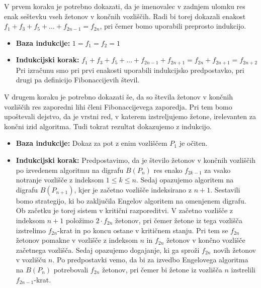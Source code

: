 \documentclass[twoside,11pt]{article}
\begin{document}
\begin{dokaz}
V prvem koraku je potrebno dokazati, da je imenovalec v zadnjem ulomku res enak seštevku vseh žetonov v končnih vozliščih. 
Radi bi torej dokazali enakost $f_1+f_3+f_5+\ldots+f_{2n-1}=f_{2n}$, pri čemer bomo uporabili preprosto indukcijo.
\begin{itemize}
    \item [] \textbf{Baza indukcije:} \quad $1=f_1=f_2=1$
    \item [] \textbf{Indukcijski korak:} \quad $f_1+f_3+f_5+\ldots+f_{2n-1}+f_{2n+1} = f_{2n} + f_{2n+1} = f_{2n+2}$ \\
    Pri izračunu smo pri prvi enakosti uporabili indukcijsko predpostavko, pri drugi pa definicijo Fibonaccijevih števil.
\end{itemize}

\noindent V drugem koraku je potrebno dokazati še, da so števila žetonov v končnih vozliščih res zaporedni lihi členi
Fibonaccijevega zaporedja. Pri tem bomo upoštevali dejstvo, da je vrstni red, v katerem izstreljujemo žetone, irelevanten za končni izid algoritma.
Tudi tokrat rezultat dokazujemo z indukcijo.
\begin{itemize}
    \item [] \textbf{Baza indukcije:} Dokaz za pot z enim vozliščem $P_1$ je očiten.
    \item [] \textbf{Indukcijski korak:} Predpostavimo, da je število žetonov v končnih vozliščih po izvedenem algoritmu na 
    digrafu $B(P_{n})$ res enako $f_{2k-1}$ za vsako notranje vozlišče z indeksom $1\le k\le n$. 
    Sedaj opazujemo algoritem na digrafu $B(P_{n+1})$, kjer je začetno vozlišče indeksirano z $n+1$. Sestavili bomo strategijo, 
    ki bo zaključila Engelov algoritem na omenjenem digrafu. Ob začetku je torej sistem v kritični razporeditvi.
    V začetno vozlišče z indeksom $n+1$ položimo $2\cdot f_{2n}$ žetonov, pri čemer žetone iz tega vozlišča izstrelimo $f_{2n}$-krat in 
    po koncu ostane v kritičnem stanju. Pri tem se $f_{2n}$ žetonov pomakne v vozlišče z indeksom $n$ in $f_{2n}$ žetonov v končno vozlišče začetnega vozlišča.
    Sedaj opazujemo dogajanje, ki ga sproži $f_{2n}$ novih žetonov v vozlišču $n$. Po predpostavki vemo, da bi za izvedbo Engelovega algoritma na $B(P_{n})$ potrebovali $f_{2n}$ žetonov, pri čemer bi žetone iz vozlišča $n$ izstrelili $f_{2n-1}$-krat. 

\end{itemize}
\end{dokaz}
\end{document}
